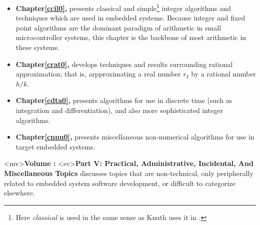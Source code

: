 \begin{itemize}
\item \textbf{Chapter\;\ref{ccil0}, \ccilzerotitle{}} presents
      classical and simple\footnote{Here \emph{classical} is used
	  in the same sense as Knuth uses it in \cite[p. 265]{bibref:b:knuthclassic2ndedvol2}.} 
	  integer algorithms and techniques which 
      are used in embedded systems.  Because integer and fixed point algorithms
      are the dominant paradigm of arithmetic in small microcontroller
      systems, this chapter is the backbone of most arithmetic in these systems.

\item \textbf{Chapter\;\ref{crat0}, \cratzerotitle{}} develops techniques
      and results surrounding rational approximation; that is, arpproximating a real number
      $r_I$ by a rational number $h/k$.

\item \textbf{Chapter\;\ref{cdta0}, \cdtazerotitle{}} presents algorithms
      for use in discrete time (such as integration and differentiation),
      and also more sophisticated integer algorithms.

\item \textbf{Chapter\;\ref{cnnu0}, \cnnuzerotitle{}} presents miscellaneous
      non-numerical algorithms for use in target embedded systems.
\end{itemize}


<mv>\textbf{Volume \vpaczeroroman{}: \vpaczerotitle{}} 
<sv>\textbf{Part V:  Practical, Administrative, Incidental, And Miscellaneous Topics}
discusses topics that are non-technical, only peripherally related to embedded system
software development,
or difficult to categorize elsewhere.

